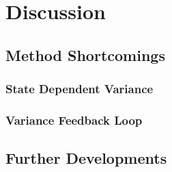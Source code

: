 \chapter{Discussion}\label{ch:disc}

\section{Method Shortcomings}

\subsection{State Dependent Variance}

\subsection{Variance Feedback Loop}

\section{Further Developments}

\cleardoublepage